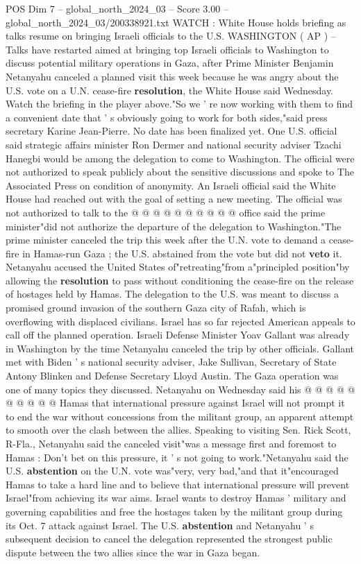 \begin{textsample}{POS Dim 7 – global\_north\_2024\_03 – Score 3.00 – global\_north\_2024\_03/200338921.txt}  \label{ex:f7_pos_219}
WATCH : White House holds briefing as talks resume on bringing Israeli officials to the U.S.
WASHINGTON ( AP ) -- Talks have restarted aimed at bringing top Israeli officials to Washington to discuss potential military operations in Gaza, after Prime Minister Benjamin Netanyahu canceled a planned visit this week because he was angry about the U.S. vote on a U.N. cease-fire \textbf{resolution}, the White House said Wednesday.
Watch the briefing in the player above."So we ' re now working with them to find a convenient date that ' s obviously going to work for both sides,"said press secretary Karine Jean-Pierre.
No date has been finalized yet.
One U.S. official said strategic affairs minister Ron Dermer and national security adviser Tzachi Hanegbi would be among the delegation to come to Washington.
The official were not authorized to speak publicly about the sensitive discussions and spoke to The Associated Press on condition of anonymity.
An Israeli official said the White House had reached out with the goal of setting a new meeting.
The official was not authorized to talk to the @ @ @ @ @ @ @ @ @ @ office said the prime minister"did not authorize the departure of the delegation to Washington."The prime minister canceled the trip this week after the U.N. vote to demand a cease-fire in Hamas-run Gaza ; the U.S. abstained from the vote but did not \textbf{veto} it.
Netanyahu accused the United States of"retreating"from a"principled position"by allowing the \textbf{resolution} to pass without conditioning the cease-fire on the release of hostages held by Hamas.
The delegation to the U.S. was meant to discuss a promised ground invasion of the southern Gaza city of Rafah, which is overflowing with displaced civilians.
Israel has so far rejected American appeals to call off the planned operation.
Israeli Defense Minister Yoav Gallant was already in Washington by the time Netanyahu canceled the trip by other officials.
Gallant met with Biden ' s national security adviser, Jake Sullivan, Secretary of State Antony Blinken and Defense Secretary Lloyd Austin.
The Gaza operation was one of many topics they discussed.
Netanyahu on Wednesday said his @ @ @ @ @ @ @ @ @ @ Hamas that international pressure against Israel will not prompt it to end the war without concessions from the militant group, an apparent attempt to smooth over the clash between the allies.
Speaking to visiting Sen.
Rick Scott, R-Fla., Netanyahu said the canceled visit"was a message first and foremost to Hamas : Don't bet on this pressure, it ' s not going to work."Netanyahu said the U.S. \textbf{abstention} on the U.N. vote was"very, very bad,"and that it"encouraged Hamas to take a hard line and to believe that international pressure will prevent Israel"from achieving its war aims.
Israel wants to destroy Hamas ' military and governing capabilities and free the hostages taken by the militant group during its Oct. 7 attack against Israel.
The U.S. \textbf{abstention} and Netanyahu ' s subsequent decision to cancel the delegation represented the strongest public dispute between the two allies since the war in Gaza began.

\end{textsample}

